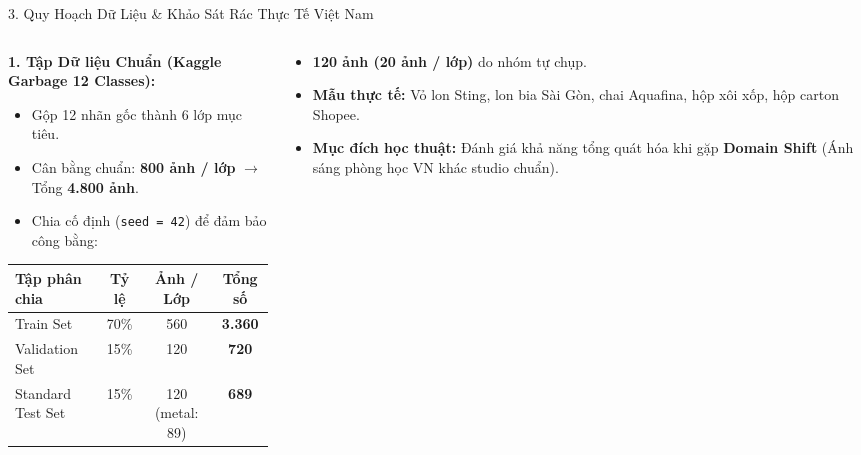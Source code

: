 \documentclass[aspectratio=169, 10pt]{beamer}
\begin{document}
\begin{frame}{3. Quy Hoạch Dữ Liệu \& Khảo Sát Rác Thực Tế Việt Nam}
\begin{columns}[T]
  \begin{column}{0.54\textwidth}
    \textbf{1. Tập Dữ liệu Chuẩn (Kaggle Garbage 12 Classes):}
    \begin{itemize}
      \item Gộp 12 nhãn gốc thành 6 lớp mục tiêu.
      \item Cân bằng chuẩn: \textbf{800 ảnh / lớp} $\rightarrow$ Tổng \textbf{4.800 ảnh}.
      \item Chia cố định (\texttt{seed = 42}) để đảm bảo công bằng:
    \end{itemize}
    \vspace{0.1cm}
    \small
    \begin{tabular}{lccc}
      \toprule
      \textbf{Tập phân chia} & \textbf{Tỷ lệ} & \textbf{Ảnh / Lớp} & \textbf{Tổng số} \\
      \midrule
      Train Set & 70\% & 560 & \textbf{3.360} \\
      Validation Set & 15\% & 120 & \textbf{720} \\
      Standard Test Set & 15\% & 120 (metal: 89) & \textbf{689} \\
      \bottomrule
    \end{tabular}
  \end{column}

  \begin{column}{0.44\textwidth}
    \begin{tcolorbox}[colback=white, colframe=AccentRed, title=\textbf{2. Tập Rác Việt Nam (\texttt{vn\_real\_test})}]
      \begin{itemize}
        \item \textbf{120 ảnh (20 ảnh / lớp)} do nhóm tự chụp.
        \item \textbf{Mẫu thực tế:} Vỏ lon Sting, lon bia Sài Gòn, chai Aquafina, hộp xôi xốp, hộp carton Shopee.
        \item \textbf{Mục đích học thuật:} Đánh giá khả năng tổng quát hóa khi gặp \alert{\textbf{Domain Shift}} (Ánh sáng phòng học VN khác studio chuẩn).
      \end{itemize}
    \end{tcolorbox}
  \end{column}
\end{columns}
\end{frame}
\end{document}
